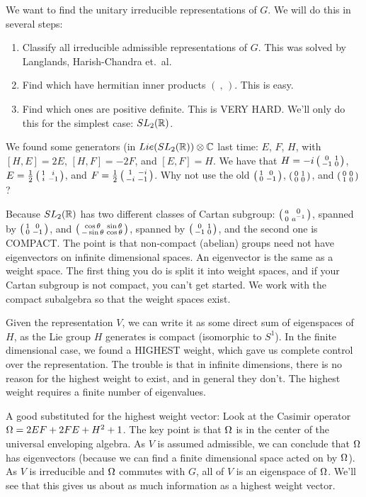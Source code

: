  We want to find the unitary irreducible representations of $G$. We will do this in
 several steps:
 \begin{enumerate}
   \item Classify all irreducible admissible representations of $G$. This was solved
   by Langlands, Harish-Chandra et.\ al.

   \item Find which have hermitian inner products $(\ ,\,)$. This is easy.

   \item Find which ones are positive definite. This is VERY HARD. We'll only do this
   for the simplest case: $SL_2(\mathbb{R})$.
 \end{enumerate}

  We found some generators (in $Lie(SL_2(\mathbb{R}))\otimes
 \mathbb{C}$ last time: $E$, $F$, $H$, with $[H,E]=2E$, $[H,F]=-2F$, and $[E,F]=H$. We have
 that $H = -i \left( \begin{smallmatrix} 0 & 1 \\ -1 & 0 \end{smallmatrix} \right)$, $E= \frac{1}{2} \left( \begin{smallmatrix} 1 & i \\ i & -1 \end{smallmatrix} \right)$, and $F=\frac{1}{2} \left( \begin{smallmatrix} 1 & -i \\ -i & -1 \end{smallmatrix} \right)$. Why not use the old $\left( \begin{smallmatrix} 1 & 0 \\ 0 & -1 \end{smallmatrix} \right)$, $\left( \begin{smallmatrix} 0 & 1 \\ 0 & 0 \end{smallmatrix} \right)$, and $\left( \begin{smallmatrix} 0 & 0 \\ 1 & 0 \end{smallmatrix} \right)$?

 Because $SL_2(\mathbb{R})$ has two different classes of Cartan subgroup: $\left( \begin{smallmatrix} a & 0 \\ 0 & a^{-1} \end{smallmatrix} \right)$, spanned by $\left( \begin{smallmatrix} 1 & 0 \\ 0 & -1 \end{smallmatrix} \right)$, and $\left( \begin{smallmatrix} \cos\theta & \sin
 \theta \\ -\sin\theta & \cos\theta \end{smallmatrix} \right)$, spanned by $\left( \begin{smallmatrix} 0 & 1 \\ -1 & 0 \end{smallmatrix} \right)$, and the second one
 is COMPACT. The point is that non-compact (abelian) groups need not have eigenvectors
 on infinite dimensional spaces. An eigenvector is the same as a weight space. The
 first thing you do is split it into weight spaces, and if your Cartan subgroup is not
 compact, you can't get started. We work with the compact subalgebra so that the
 weight spaces exist.

 Given the representation $V$, we can write it as some direct sum of eigenspaces of
 $H$, as the Lie group $H$ generates is compact (isomorphic to $S^1$). In the
 finite dimensional case, we found a HIGHEST weight, which gave us complete control
 over the representation. The trouble is that in infinite dimensions, there is no
 reason for the highest weight to exist, and in general they don't. The highest weight
 requires a finite number of eigenvalues.

 A good substituted for the highest weight vector: Look at the Casimir operator $\Omega =
 2EF+2FE + H^2+1$. The key point is that $\Omega$ is in the center of the universal
 enveloping algebra. As $V$ is assumed admissible, we can conclude that $\Omega$ has
 eigenvectors (because we can find a finite dimensional space acted on by $\Omega$). As
 $V$ is irreducible and $\Omega$ commutes with $G$, all of $V$ is an eigenspace of $\Omega$.
 We'll see that this gives us about as much information as a highest weight vector.

